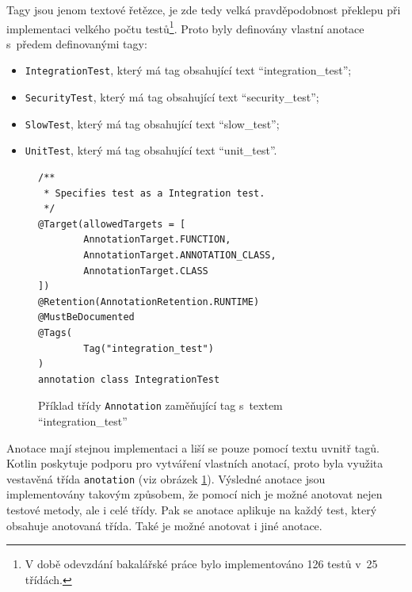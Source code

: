     Tagy jsou jenom textové řetězce, je zde tedy velká pravděpodobnost překlepu při implementaci velkého počtu testů\footnote{V době odevzdání bakalářské práce bylo implementováno 126 testů v~25 třídách.}. Proto byly definovány vlastní anotace s~předem definovanými tagy:
    \begin{itemize}
            \setlength\itemsep{0.3em}
            \item \verb|IntegrationTest|, který má tag obsahující text \enquote{integration\_test};
            \item \verb|SecurityTest|, který má tag obsahující text \enquote{security\_test};
            \item \verb|SlowTest|, který má tag obsahující text \enquote{slow\_test};
            \item \verb|UnitTest|, který má tag obsahující text \enquote{unit\_test}.
    \end{itemize}
    
    \begin{figure}
        \begin{verbatim}
/**
 * Specifies test as a Integration test.
 */
@Target(allowedTargets = [
        AnnotationTarget.FUNCTION,
        AnnotationTarget.ANNOTATION_CLASS,
        AnnotationTarget.CLASS
])
@Retention(AnnotationRetention.RUNTIME)
@MustBeDocumented
@Tags(
        Tag("integration_test")
)
annotation class IntegrationTest
        \end{verbatim}
        \caption{Příklad třídy \texttt{Annotation} zaměňující tag s~textem \enquote{integration\_test}} 
        \label{code:annotation-class}
    \end{figure}
    Anotace mají stejnou implementaci a liší se pouze pomocí textu uvnitř tagů. Kotlin poskytuje podporu pro vytváření vlastních anotací, proto byla využita vestavěná třída \verb|anotation| (viz obrázek \ref{code:annotation-class}). Výsledné anotace jsou implementovány takovým způsobem, že pomocí nich je možné anotovat nejen testové metody, ale i celé třídy. Pak se anotace aplikuje na každý test, který obsahuje anotovaná třída. Také je možné anotovat i jiné anotace.

